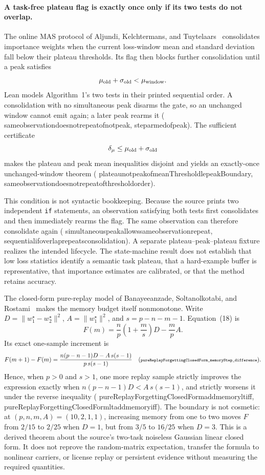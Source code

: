 \documentclass[11pt]{article}
\newcommand{\leanname}[1]{{\scriptsize\ttfamily
  \def\_{\textunderscore\allowbreak}#1}}
\begin{document}
\paragraph{A task-free plateau flag is exactly once only if its two tests do not overlap.}
The online MAS protocol of Aljundi, Kelchtermans, and
Tuytelaars~\cite{aljundi2019taskfree} consolidates importance weights when
the current loss-window mean and standard deviation fall below their plateau
thresholds.  Its flag then blocks further consolidation until a peak satisfies
\[
 \mu_{\rm old}+\sigma_{\rm old}<\mu_{\rm window}.
\]
Lean models Algorithm~1's two tests in their printed sequential order.  A
consolidation with no simultaneous peak disarms the gate, so an unchanged
window cannot emit again; a later peak rearms it
(\leanname{same\_observation\_does\_not\_repeat\_of\_not\_peak},
\leanname{step\_armed\_of\_peak}).
The sufficient certificate
\[
 \delta_\mu\leq\mu_{\rm old}+\sigma_{\rm old}
\]
makes the plateau and peak mean inequalities disjoint and yields an
exactly-once unchanged-window theorem
(\leanname{plateau\_not\_peak\_of\_meanThreshold\_le\_peakBoundary},
\leanname{same\_observation\_does\_not\_repeat\_of\_threshold\_order}).

This condition is not syntactic bookkeeping.  Because the source prints two
independent \texttt{if} statements, an observation satisfying both tests first
consolidates and then immediately rearms the flag.  The same observation can
therefore consolidate again
(\leanname{simultaneous\_peak\_allows\_same\_observation\_repeat},
\leanname{sequential\_if\_overlap\_repeats\_consolidation}).
A separate plateau--peak--plateau fixture realizes the intended lifecycle.
The state-machine result does not establish that low loss statistics identify
a semantic task plateau, that a hard-example buffer is representative, that
importance estimates are calibrated, or that the method retains accuracy.

The closed-form pure-replay model of Banayeeanzade, Soltanolkotabi, and
Rostami~\cite{banayeeanzade2025replay} makes the memory budget itself
nonmonotone.  Write
$D=\lVert w_1^\star-w_2^\star\rVert^2$,
$A=\lVert w_1^\star\rVert^2$, and $s=p-n-m-1$.  Equation~(18) is
\[
  F(m)=\frac{n}{p}\left(1+\frac{m}{s}\right)D-\frac{m}{p}A.
\]
Its exact one-sample increment is
\[
 F(m+1)-F(m)
 =\frac{n(p-n-1)D-A\,s(s-1)}{p\,s(s-1)}
 \quad
 \text{(\leanname{pureReplayForgettingClosedForm\_memoryStep\_difference}).}
\]
Hence, when $p>0$ and $s>1$, one more replay sample strictly improves the
expression exactly when
$n(p-n-1)D<A\,s(s-1)$, and strictly worsens it under the reverse inequality
(\leanname{pureReplayForgettingClosedForm\_add\_memory\_lt\_iff},
\leanname{pureReplayForgettingClosedForm\_lt\_add\_memory\_iff}).
The boundary is not cosmetic: at $(p,n,m,A)=(10,2,1,1)$, increasing memory
from one to two moves $F$ from $2/15$ to $2/25$ when $D=1$, but from $3/5$ to
$16/25$ when $D=3$.  This is a derived theorem about the source's
two-task noiseless Gaussian linear closed form.  It does not reprove the
random-matrix expectation, transfer the formula to nonlinear carriers, or
license replay or persistent evidence without measuring the required
quantities.
\end{document}
